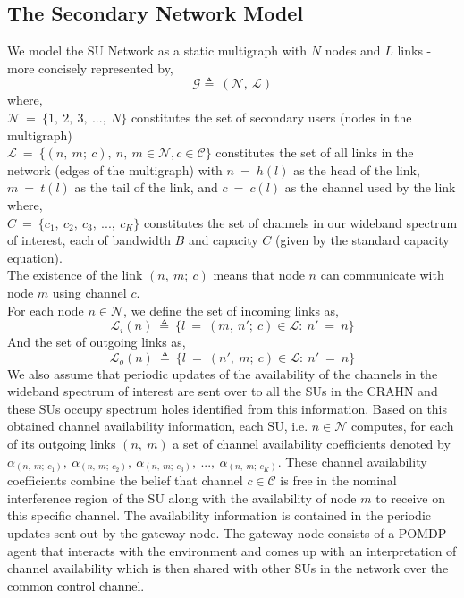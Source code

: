 \documentclass[12pt, draftcls, onecolumn]{IEEEtran}
\begin{document}
\subsection{The Secondary Network Model}
We model the SU Network as a static multigraph with $N$ nodes and $L$ links - more concisely represented by,
\[\mathcal{G} \triangleq\ (\mathcal{N},\ \mathcal{L})\] 
where,
\\$\mathcal{N}\ =\ \{1,\ 2,\ 3,\ ...,\ N\}$ constitutes the set of secondary users (nodes in the multigraph)
\\$\mathcal{L}\ =\ \{(n,\ m;\ c),\ n,\ m \in \mathcal{N}, c \in \mathcal{C}\}$ constitutes the set of all links in the network (edges of the multigraph) with $n\ =\ h(l)$ as the head of the link, $m\ =\ t(l)$ as the tail of the link, and $c\ =\ c(l)$ as the channel used by the link
\\where, 
\\$C\ =\ \{c_1,\ c_2,\ c_3,\ ...,\ c_K\}$ constitutes the set of channels in our wideband spectrum of interest, each of bandwidth $B$ and capacity $C$ (given by the standard capacity equation).
\\The existence of the link $(n,\ m;\ c)$ means that node $n$ can communicate with node $m$ using channel $c$.
\\For each node $n \in \mathcal{N}$, we define the set of incoming links as,
\[\mathcal{L}_i(n)\ \triangleq\ \{l\ =\ (m,\ n';\ c) \in \mathcal{L}:\ n'\ =\ n\}\]
And the set of outgoing links as,
\[\mathcal{L}_o(n)\ \triangleq\ \{l\ =\ (n',\ m;\ c) \in \mathcal{L}:\ n'\ =\ n\}\]
We also assume that periodic updates of the availability of the channels in the wideband spectrum of interest are sent over to all the SUs in the CRAHN and these SUs occupy spectrum holes identified from this information. Based on this obtained channel availability information, each SU, i.e. $n \in \mathcal{N}$ computes, for each of its outgoing links $(n,\ m)$ a set of channel availability coefficients denoted by $\alpha_{(n,\ m;\ c_1)},\ \alpha_{(n,\ m;\ c_2)},\ \alpha_{(n,\ m;\ c_3)},\ ...,\ \alpha_{(n,\ m;\ c_K)}$. These channel availability coefficients combine the belief that channel $c \in \mathcal{C}$ is free in the nominal interference region of the SU along with the availability of node $m$ to receive on this specific channel. The availability information is contained in the periodic updates sent out by the gateway node. The gateway node consists of a POMDP agent that interacts with the environment and comes up with an interpretation of channel availability which is then shared with other SUs in the network over the common control channel.
\end{document}
